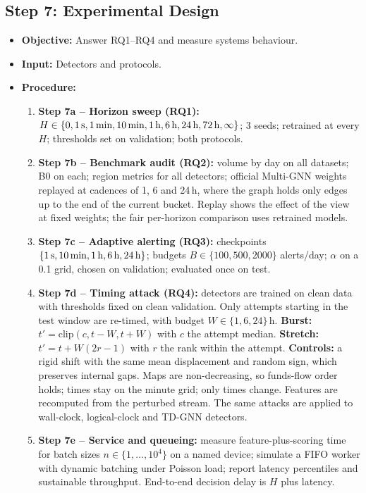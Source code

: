 \documentclass[11pt,a4paper]{article}
\begin{document}
\subsection{Step 7: Experimental Design}
\begin{itemize}[leftmargin=*]
    \item \textbf{Objective:} Answer RQ1--RQ4 and measure systems behaviour.
    \item \textbf{Input:} Detectors and protocols.
    \item \textbf{Procedure:}
    \begin{enumerate}[leftmargin=*]
        \item \textbf{Step 7a -- Horizon sweep (RQ1):} $H\in\{0, 1\text{\,s}, 1\text{\,min}, 10\text{\,min}, 1\text{\,h}, 6\text{\,h}, 24\text{\,h}, 72\text{\,h}, \infty\}$; 3 seeds; retrained at every $H$; thresholds set on validation; both protocols.
        \item \textbf{Step 7b -- Benchmark audit (RQ2):} volume by day on all datasets; B0 on each; region metrics for all detectors; official Multi-GNN weights replayed at cadences of 1, 6 and 24\,h, where the graph holds only edges up to the end of the current bucket. Replay shows the effect of the view at fixed weights; the fair per-horizon comparison uses retrained models.
        \item \textbf{Step 7c -- Adaptive alerting (RQ3):} checkpoints $\{1\text{\,s}, 10\text{\,min}, 1\text{\,h}, 6\text{\,h}, 24\text{\,h}\}$; budgets $B\in\{100,500,2000\}$ alerts/day; $\alpha$ on a 0.1 grid, chosen on validation; evaluated once on test.
        \item \textbf{Step 7d -- Timing attack (RQ4):} detectors are trained on clean data with thresholds fixed on clean validation. Only attempts starting in the test window are re-timed, with budget $W\in\{1,6,24\}$\,h. \textbf{Burst:} $t'=\mathrm{clip}(c, t-W, t+W)$ with $c$ the attempt median. \textbf{Stretch:} $t'=t+W(2r-1)$ with $r$ the rank within the attempt. \textbf{Controls:} a rigid shift with the same mean displacement and random sign, which preserves internal gaps. Maps are non-decreasing, so funds-flow order holds; times stay on the minute grid; only times change. Features are recomputed from the perturbed stream. The same attacks are applied to wall-clock, logical-clock and TD-GNN detectors.
        \item \textbf{Step 7e -- Service and queueing:} measure feature-plus-scoring time for batch sizes $n\in\{1,\dots,10^4\}$ on a named device; simulate a FIFO worker with dynamic batching under Poisson load; report latency percentiles and sustainable throughput. End-to-end decision delay is $H$ plus latency.

\end{enumerate}
\end{itemize}
\end{document}
